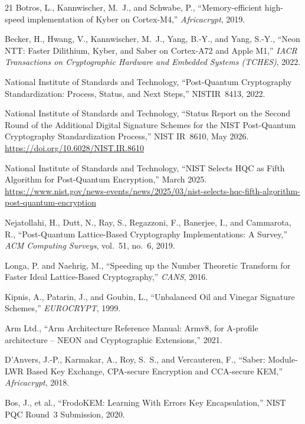 \documentclass[utf8]{FrontiersinHarvard}
\begin{document}
\begin{thebibliography}{21}
Botros, L., Kannwischer, M.~J., and Schwabe, P.,
``Memory-efficient high-speed implementation of Kyber on Cortex-M4,''
\emph{Africacrypt}, 2019.

Becker, H., Hwang, V., Kannwischer, M.~J., Yang, B.-Y., and Yang, S.-Y.,
``Neon NTT: Faster Dilithium, Kyber, and Saber on Cortex-A72 and Apple M1,''
\emph{IACR Transactions on Cryptographic Hardware and Embedded Systems (TCHES)}, 2022.

National Institute of Standards and Technology,
``Post-Quantum Cryptography Standardization: Process, Status, and Next Steps,''
NISTIR~8413, 2022.

National Institute of Standards and Technology,
``Status Report on the Second Round of the Additional Digital Signature Schemes for the NIST Post-Quantum Cryptography Standardization Process,''
NIST IR~8610, May 2026.
\url{https://doi.org/10.6028/NIST.IR.8610}

National Institute of Standards and Technology,
``NIST Selects HQC as Fifth Algorithm for Post-Quantum Encryption,''
March 2025.
\url{https://www.nist.gov/news-events/news/2025/03/nist-selects-hqc-fifth-algorithm-post-quantum-encryption}

Nejatollahi, H., Dutt, N., Ray, S., Regazzoni, F., Banerjee, I., and Cammarota, R.,
``Post-Quantum Lattice-Based Cryptography Implementations: A Survey,''
\emph{ACM Computing Surveys}, vol.~51, no.~6, 2019.

Longa, P. and Naehrig, M.,
``Speeding up the Number Theoretic Transform for Faster Ideal Lattice-Based Cryptography,''
\emph{CANS}, 2016.

Kipnis, A., Patarin, J., and Goubin, L.,
``Unbalanced Oil and Vinegar Signature Schemes,''
\emph{EUROCRYPT}, 1999.

Arm Ltd.,
``Arm Architecture Reference Manual: Armv8, for A-profile architecture -- NEON and Cryptographic Extensions,''
2021.

D'Anvers, J.-P., Karmakar, A., Roy, S.~S., and Vercauteren, F.,
``Saber: Module-LWR Based Key Exchange, CPA-secure Encryption and CCA-secure KEM,''
\emph{Africacrypt}, 2018.

Bos, J., et al.,
``FrodoKEM: Learning With Errors Key Encapsulation,''
NIST PQC Round~3 Submission, 2020.


\end{thebibliography}
\end{document}
